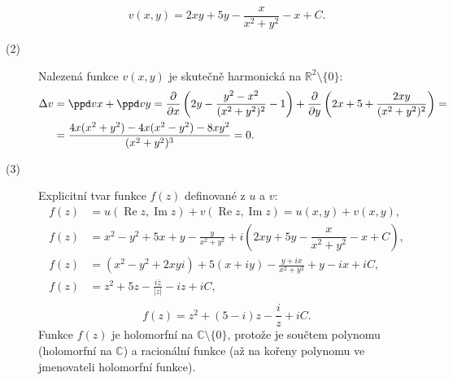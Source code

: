 \documentclass[10pt,a4paper]{article}
\begin{document}
\begin{description}
\begin{equation}
\boxed{
v(x,y) = 2xy+5y-\dfrac{x}{x^{2}+y^{2}}-x+C .
}
\end{equation}
\item[(2)] Nalezená funkce $v(x,y)$ je skutečně harmonická na $\mathbb{R}^{2}\setminus\lbrace 0\rbrace$:
\begin{equation}
\begin{split}
\Delta v &= \ppd v x + \ppd v y  =  \frac{\partial}{\partial x}
\left( 2y - \frac{y^{2}-x^{2}}{(x^{2}+y^{2})^{2}} -1 \right)+\frac{\partial}{\partial y} \left(2x+5 +\frac{2xy}{(x^{2}+y^{2})^{2}} \right) =  \\
& = \dfrac{4x(x^{2}+y^{2})-4x(x^{2}-y^{2})-8xy^{2}}{(x^{2}+y^{2})^{3}}=0 .\\
\end{split}
\end{equation}
\item[(3)] Explicitní tvar funkce $f(z)$ definované z $u$ a $v$:
\begin{equation}
\begin{split}
f(z) & =u(\operatorname{Re} z,\operatorname{Im} z)+ v(\operatorname{Re} z,\operatorname{Im} z) = u(x,y)+v(x,y) ,\\
f(z) & = x^2-y^2+5x+y-\frac{y}{x^2+y^2} +i (2xy+5y-\dfrac{x}{x^{2}+y^{2}}-x+C) ,\\
f(z) & = (x^{2}-y^{2}+2xyi)+5(x+iy)-\frac{y+ix}{x^{2}+y^{2}}+y-ix+iC ,\\
f(z) & = z^{2}+5z-\frac{i\overline{z}}{|z|}-iz+iC ,\\
\end{split} 
\end{equation}
\begin{equation}
\boxed{f(z) = z^{2}+(5-i)z-\frac{i}{z}+iC.}
\end{equation}
Funkce $f(z)$ je holomorfní na $\mathbb{C}\setminus\lbrace 0\rbrace$, protože je součtem polynomu (holomorfní na $\mathbb{C}$) a racionální funkce (až na kořeny polynomu ve jmenovateli holomorfní funkce).
\end{description}
\end{document}
